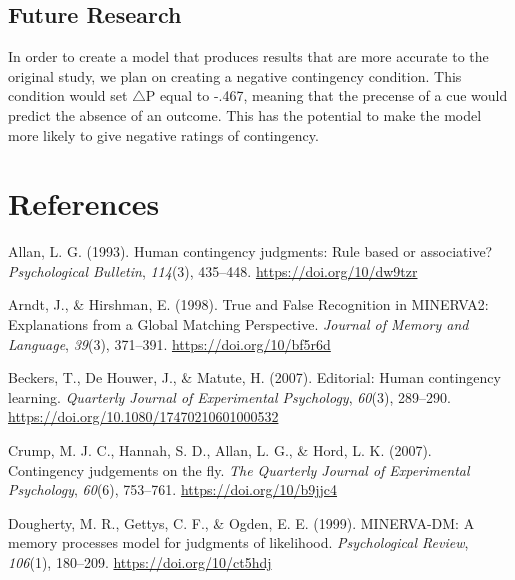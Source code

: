 \documentclass[
  english,
  man,floatsintext]{apa6}
\begin{document}
\hypertarget{future-research}{%
\subsection{Future Research}\label{future-research}}

In order to create a model that produces results that are more accurate to the original study, we plan on creating a negative contingency condition. This condition would set \(\triangle\)P equal to -.467, meaning that the precense of a cue would predict the absence of an outcome. This has the potential to make the model more likely to give negative ratings of contingency.

\newpage

\hypertarget{references}{%
\section{References}\label{references}}

\begingroup
\setlength{\parindent}{-0.5in}
\setlength{\leftskip}{0.5in}

\hypertarget{refs}{}
\leavevmode\hypertarget{ref-allanHumanContingencyJudgments1993}{}%
Allan, L. G. (1993). Human contingency judgments: Rule based or associative? \emph{Psychological Bulletin}, \emph{114}(3), 435--448. \url{https://doi.org/10/dw9tzr}

\leavevmode\hypertarget{ref-arndtTrueFalseRecognition1998}{}%
Arndt, J., \& Hirshman, E. (1998). True and False Recognition in MINERVA2: Explanations from a Global Matching Perspective. \emph{Journal of Memory and Language}, \emph{39}(3), 371--391. \url{https://doi.org/10/bf5r6d}

\leavevmode\hypertarget{ref-beckers_editorial_2007}{}%
Beckers, T., De Houwer, J., \& Matute, H. (2007). Editorial: Human contingency learning. \emph{Quarterly Journal of Experimental Psychology}, \emph{60}(3), 289--290. \url{https://doi.org/10.1080/17470210601000532}

\leavevmode\hypertarget{ref-crumpContingencyJudgementsFly2007}{}%
Crump, M. J. C., Hannah, S. D., Allan, L. G., \& Hord, L. K. (2007). Contingency judgements on the fly. \emph{The Quarterly Journal of Experimental Psychology}, \emph{60}(6), 753--761. \url{https://doi.org/10/b9jjc4}

\leavevmode\hypertarget{ref-doughertyMINERVADMMemoryProcesses1999}{}%
Dougherty, M. R., Gettys, C. F., \& Ogden, E. E. (1999). MINERVA-DM: A memory processes model for judgments of likelihood. \emph{Psychological Review}, \emph{106}(1), 180--209. \url{https://doi.org/10/ct5hdj}
\end{document}
